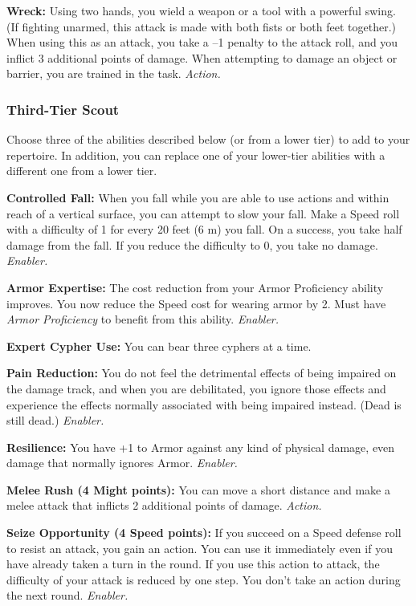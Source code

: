 \documentclass[a4paper,10pt,final,twocolumn,oneside]{book}
\newcommand{\itemAbility}[2]{\textcolor{25gray}{\textbullet\textbf{ #1:}}{ #2}\par}
\newcommand{\enabler}{\textit{ Enabler.}}
\newcommand{\action}{\textit{ Action.}}
\begin{document}
\itemAbility{Wreck}{Using two hands, you wield a weapon or a tool with a powerful swing. (If fighting unarmed, this attack is made with both fists or both feet together.) When using this as an attack, you take a –1 penalty to the attack roll, and you inflict 3 additional points of damage. When attempting to damage an object or barrier, you are trained in the task. \action}


\subsubsection*{Third-Tier Scout}
\label{subsub:scoutThirdTier}

Choose three of the abilities described
below (or from a lower tier) to add to your
repertoire. In addition, you can replace one
of your lower-tier abilities with a different
one from a lower tier.

\itemAbility{Controlled Fall}{When you fall while you are able to use actions and within reach of a vertical surface, you can attempt to slow your fall. Make a Speed roll with a difficulty of 1 for every 20 feet (6 m) you fall. On a success, you take half damage from the fall. If you reduce the difficulty to 0, you take no damage.\enabler}

\itemAbility{Armor Expertise}{The cost reduction from your Armor Proficiency ability improves. You now reduce the Speed cost for wearing armor by 2. Must have \textit{Armor Proficiency} to benefit from this ability.\enabler}

\itemAbility{Expert Cypher Use}{You can bear three cyphers at a time.}

\itemAbility{Pain Reduction}{You do not feel the detrimental effects of being impaired on the damage track, and when you are debilitated, you ignore those effects and experience the effects normally associated with being impaired instead. (Dead is still dead.)\enabler}

\itemAbility{Resilience}{You have +1 to Armor against any kind of physical damage, even damage that normally ignores Armor.\enabler}

\itemAbility{Melee Rush (4 Might points)}{You can move a short distance and make a melee attack that inflicts 2 additional points of damage.\action}

\itemAbility{Seize Opportunity (4 Speed points)}{If you succeed on a Speed defense roll to resist an attack, you gain an action. You can use it immediately even if you have already taken a turn in the round. If you use this action to attack, the difficulty of your attack is reduced by one step. You don’t take an action during the next round. \enabler}
\end{document}
